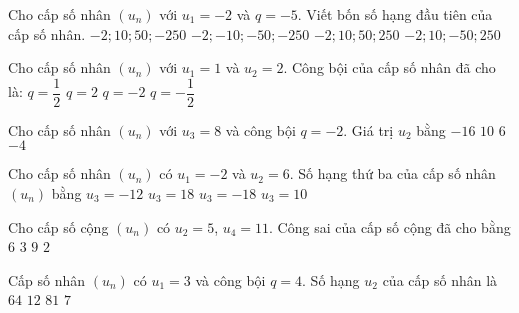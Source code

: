 \begin{ex}
Cho cấp số nhân $(u_n)$ với $u_1=-2$ và $q=-5$. Viết bốn số hạng đầu tiên của cấp số nhân.
\choice
{$-2;10;50;-250$}
{$-2;-10;-50;-250$}
{$-2;10;50;250$}
{\True $-2;10;-50;250$}
\end{ex}
\begin{ex}
Cho cấp số nhân $(u_n)$ với $u_1=1$ và $u_2=2$. Công bội của cấp số nhân đã cho là:
\choice
{$q = \dfrac{1}{2}$}
{\True $q = 2$}
{$q = -2$}
{$q = -\dfrac{1}{2}$}
\end{ex}
\begin{ex}
Cho cấp số nhân $(u_n)$ với $u_3=8$ và công bội $q=-2$. Giá trị $u_2$ bằng
\choice
{$-16$}
{$10$}
{$6$}
{\True $-4$}
\end{ex}
\begin{ex}
Cho cấp số nhân $(u_n)$ có $u_1=-2$ và $u_2=6$. Số hạng thứ ba của cấp số nhân $(u_n)$ bằng
\choice
{$u_3=-12$}
{$u_3=18$}
{\True $u_3=-18$}
{$u_3=10$}
\end{ex}
\begin{ex}
Cho cấp số cộng $(u_n)$ có $u_2=5$, $u_4=11$. Công sai của cấp số cộng đã cho bằng
\choice
{$6$}
{\True $3$}
{$9$}
{$2$}
\end{ex}
\begin{ex}
Cấp số nhân $(u_n)$ có $u_1=3$ và công bội $q=4$. Số hạng $u_2$ của cấp số nhân là
\choice
{$64$}
{\True $12$}
{$81$}
{$7$}
\end{ex}
